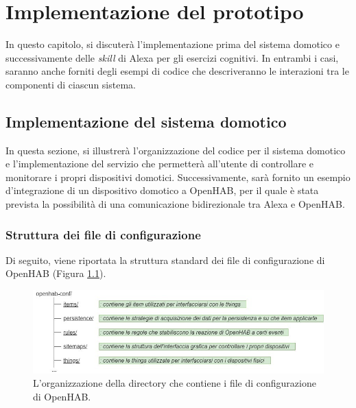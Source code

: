
\chapter{Implementazione del prototipo}
\label{ch:Chapter5}

In questo capitolo, si discuterà l’implementazione prima del sistema domotico e
successivamente delle \textit{skill} di Alexa per gli esercizi cognitivi. In
entrambi i casi, saranno anche forniti degli esempi di codice che descriveranno
le interazioni tra le componenti di ciascun sistema.

\section{Implementazione del sistema domotico}
\label{sec:Sezione5.1}

In questa sezione, si illustrerà l’organizzazione del codice per il sistema
domotico e l’implementazione del servizio che permetterà all’utente di
controllare e monitorare i propri dispositivi domotici. Successivamente, sarà
fornito un esempio d'integrazione di un dispositivo domotico a OpenHAB, per il
quale è stata prevista la possibilità di una comunicazione bidirezionale tra
Alexa e OpenHAB.

\subsection{Struttura dei file di configurazione}
\label{subsec:Sezione5.1.1}

Di seguito, viene riportata la struttura standard dei file di configurazione di
OpenHAB (Figura \ref{fig:figure5.1}).

\begin{figure}[!ht]
  \centering
  \includegraphics[scale=0.58]{resources/images/implementation/openhab-project-organization.jpg}
  \caption{
    L'organizzazione della directory che contiene i file di configurazione di
    OpenHAB.
  }
  \label{fig:figure5.1}
\end{figure}

